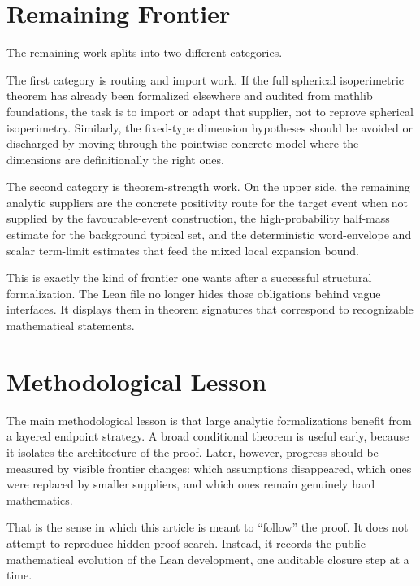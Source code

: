 \documentclass[11pt]{article}
\begin{document}
\section{Remaining Frontier}

The remaining work splits into two different categories.

The first category is routing and import work.  If the full spherical
isoperimetric theorem has already been formalized elsewhere and audited from
mathlib foundations, the task is to import or adapt that supplier, not to
reprove spherical isoperimetry.  Similarly, the fixed-type dimension hypotheses
should be avoided or discharged by moving through the pointwise concrete model
where the dimensions are definitionally the right ones.

The second category is theorem-strength work.  On the upper side, the remaining
analytic suppliers are the concrete positivity route for the target event when
not supplied by the favourable-event construction, the high-probability
half-mass estimate for the background typical set, and the deterministic
word-envelope and scalar term-limit estimates that feed the mixed local
expansion bound.

This is exactly the kind of frontier one wants after a successful structural
formalization.  The Lean file no longer hides those obligations behind vague
interfaces.  It displays them in theorem signatures that correspond to
recognizable mathematical statements.

\section{Methodological Lesson}

The main methodological lesson is that large analytic formalizations benefit
from a layered endpoint strategy.  A broad conditional theorem is useful early,
because it isolates the architecture of the proof.  Later, however, progress
should be measured by visible frontier changes: which assumptions disappeared,
which ones were replaced by smaller suppliers, and which ones remain genuinely
hard mathematics.

That is the sense in which this article is meant to ``follow'' the proof.  It
does not attempt to reproduce hidden proof search.  Instead, it records the
public mathematical evolution of the Lean development, one auditable closure
step at a time.
\end{document}
